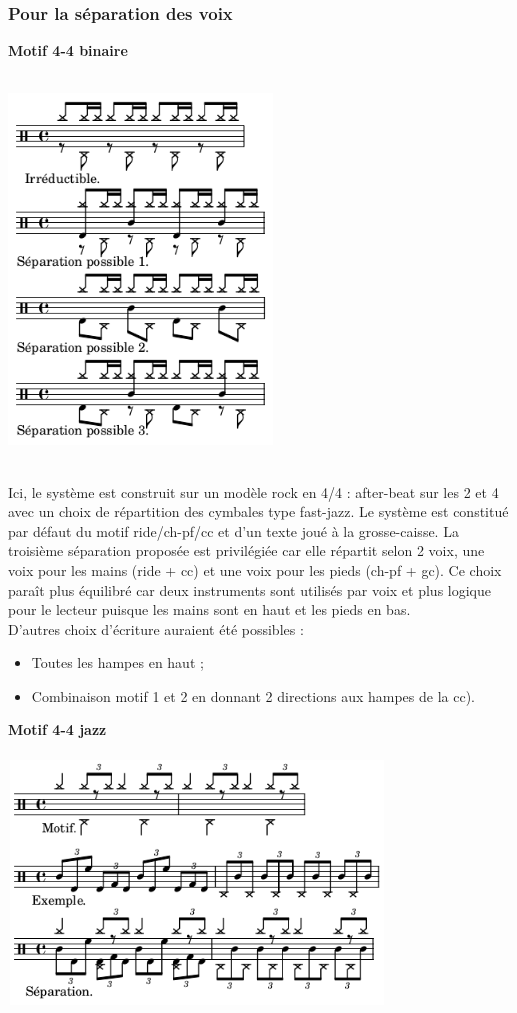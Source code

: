 \subsubsection{Pour la séparation des voix}
\textbf{Motif 4-4 binaire}\\\\
\includegraphics[height=100mm, width=70mm]{z_images/1_description_notation/separation/1_separation_4-4_binaire.png}\\\\
Ici, le système est construit sur un modèle rock en 4/4 : after-beat sur les 2 et 4 avec un choix de répartition des cymbales type fast-jazz. Le système est constitué par défaut du motif ride/ch-pf/cc et d’un texte joué à la grosse-caisse. La troisième séparation proposée est privilégiée car elle répartit selon 2 voix, une voix pour les mains (ride + cc) et une voix pour les pieds (ch-pf + gc). Ce choix paraît plus équilibré car deux instruments sont utilisés par voix et plus logique pour le lecteur puisque les mains sont en haut et les pieds en bas.\\
D’autres choix d’écriture auraient été possibles :
\begin{itemize}
	\item Toutes les hampes en haut ;
	\item Combinaison motif 1 et 2 en donnant 2 directions aux hampes de la cc).\\
\end{itemize}
\newpage
\textbf{Motif 4-4 jazz}\\\\
\includegraphics[height=65mm, width=100mm]{z_images/1_description_notation/separation/2_separation_4-4_jazz.png}\\\\
